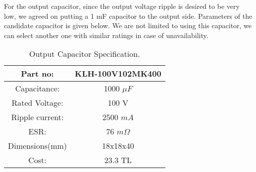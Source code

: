 For the output capacitor, since the output voltage ripple is desired to be very low, we agreed on putting a 1 mF capacitor to the output side. Parameters of the candidate capacitor is given below. We are not limited to using this capacitor, we can select another one with similar ratings in case of unavailability.

\begin{table}[H]
    \centering
    \caption{Output Capacitor Specification.\cite{web:output_cap}}
    \label{tab:output_Cap}
    \begin{tabular}{|c|c|}
        \hline
        Part no:        & KLH-100V102MK400  \\
        \hline
        Capacitance:    & 1000 $\mu F$      \\
        \hline
        Rated Voltage:  & 100 V             \\
        \hline
        Ripple current: & 2500 $mA$         \\
        \hline
        ESR:            & 76 $m\Omega$      \\
        \hline
        Dimensions(mm)  & 18x18x40          \\
        \hline
        Cost:           & 23.3 TL           \\
        \hline
    \end{tabular}
\end{table}